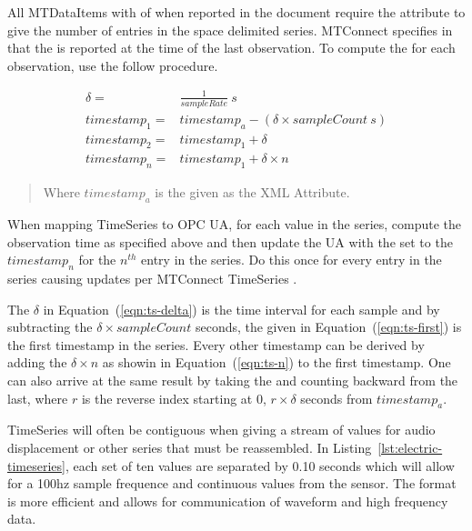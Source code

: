 All \glspl{MTDataItem} with  of  when reported in the  document require the attribute  to give the number of entries in the space delimited series. MTConnect specifies in \cite{MTCPart3} that the  is reported at the time of the last observation. To compute the  for each observation, use the follow procedure.

\begin{align}
  \delta =& \frac{1}{sampleRate}\ s \label{eqn:ts-delta} \\
  timestamp_1 =& timestamp_a - (\delta \times sampleCount\ s) \label{eqn:ts-first} \\
  timestamp_2 =& timestamp_1 + \delta  \label{eqn:ts-second} \\
  timestamp_n =& timestamp_1 + \delta \times n \label{eqn:ts-n}
\end{align}
\begin{quote}
  Where $timestamp_a$ is the  given as the XML Attribute.
\end{quote}

When mapping \gls{TimeSeries} to OPC UA, for each value in the series, compute the observation time as specified above and then update the UA  with the  set to the $timestamp_n$ for the $n^{th}$ entry in the series. Do this once for every entry in the series causing  updates per MTConnect \gls{TimeSeries} .

The $\delta$ in Equation~(\ref{eqn:ts-delta}) is the time interval for each sample and by subtracting the $\delta \times sampleCount$ seconds, the given in Equation~(\ref{eqn:ts-first}) is the first timestamp in the series. Every other timestamp can be derived by adding the $\delta \times n$ as showin in Equation~(\ref{eqn:ts-n}) to the first timestamp. One can also arrive at the same result by taking the  and counting backward from the last, where $r$ is the reverse index starting at 0, $r \times \delta$ seconds from $timestamp_a$.

\gls{TimeSeries}  will often be contiguous when giving a stream of values for audio displacement or other series that must be reassembled. In Listing~\ref{lst:electric-timeseries}, each set of ten values are separated by 0.10 seconds which will allow for a 100hz sample frequence and continuous values from the sensor. The format is more efficient and allows for communication of waveform and high frequency data.

